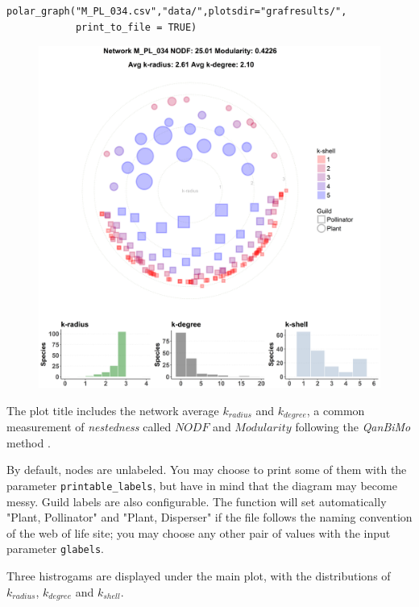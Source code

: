 \documentclass[12pt]{article}
\begin{document}
\fontsize{3.5mm}{3.5mm}\selectfont
\begin{verbatim}
polar_graph("M_PL_034.csv","data/",plotsdir="grafresults/",
            print_to_file = TRUE)
\end{verbatim}
\normalsize

\begin{figure}[h!]
\centering
\includegraphics[scale=0.4]{M_PL_034_polar.png}
\label{fig:M_PL_034_polar}
\end{figure}

The plot title includes the network average ${k}_{radius}$ and ${k}_{degree}$, a common measurement of \textit{nestedness} called $NODF$ \cite{almeida2008consistent} and $Modularity$ following the \textit{QanBiMo} method \cite{dormann2014method}.

By default, nodes are unlabeled. You may choose to print some of them with the parameter \texttt{printable\_labels}, but have in mind that the
diagram may become messy. Guild labels are also configurable. The function will set automatically "Plant, Pollinator" and "Plant, Disperser" if the
file follows the naming convention of the web of life site; you may choose any other pair of values with the input parameter \texttt{glabels}.

Three histrogams are displayed under the main plot, with the distributions of $k_{radius}$, $k_{degree}$ and $k_{shell}$. 
\end{document}
